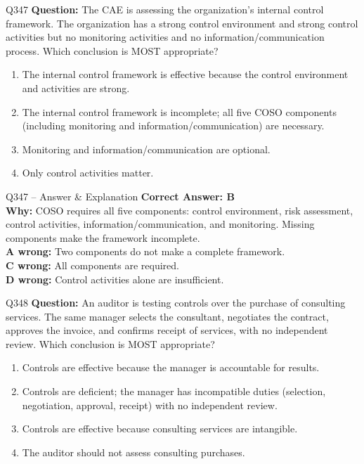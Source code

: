 \documentclass[aspectratio=169,10pt]{beamer}
\begin{document}
	\begin{frame}[t]{Q347}
		\small
		\textbf{Question:} The CAE is assessing the organization's internal control framework. The organization has a strong control environment and strong control activities but no monitoring activities and no information/communication process. Which conclusion is MOST appropriate?
		\begin{enumerate}[label=\Alph*.,itemsep=1pt,topsep=2pt]
			\item The internal control framework is effective because the control environment and activities are strong.
			\item The internal control framework is incomplete; all five COSO components (including monitoring and information/communication) are necessary.
			\item Monitoring and information/communication are optional.
			\item Only control activities matter.
		\end{enumerate}
	\end{frame}
	
	\begin{frame}[t]{Q347 -- Answer \& Explanation}
		\small
		\textbf{Correct Answer: B} \\[4pt]
		\textbf{Why:} COSO requires all five components: control environment, risk assessment, control activities, information/communication, and monitoring. Missing components make the framework incomplete. \\[4pt]
		\textbf{A wrong:} Two components do not make a complete framework. \\[2pt]
		\textbf{C wrong:} All components are required. \\[2pt]
		\textbf{D wrong:} Control activities alone are insufficient.
	\end{frame}
	
	\begin{frame}[t]{Q348}
		\small
		\textbf{Question:} An auditor is testing controls over the purchase of consulting services. The same manager selects the consultant, negotiates the contract, approves the invoice, and confirms receipt of services, with no independent review. Which conclusion is MOST appropriate?
		\begin{enumerate}[label=\Alph*.,itemsep=1pt,topsep=2pt]
			\item Controls are effective because the manager is accountable for results.
			\item Controls are deficient; the manager has incompatible duties (selection, negotiation, approval, receipt) with no independent review.
			\item Controls are effective because consulting services are intangible.
			\item The auditor should not assess consulting purchases.
		\end{enumerate}
	\end{frame}
	
\end{document}
